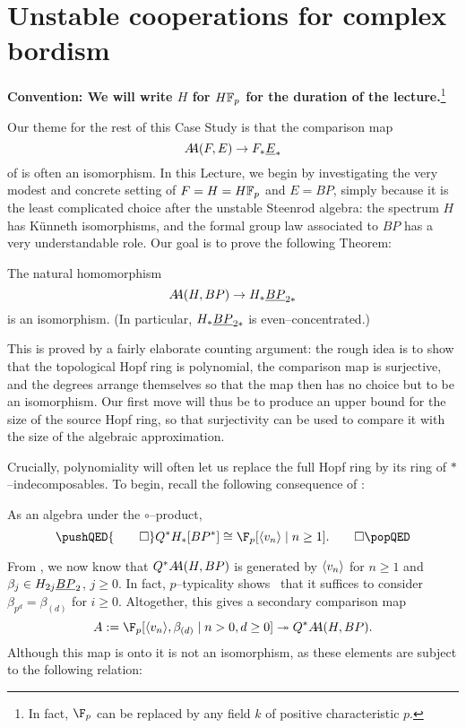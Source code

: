 \section{Unstable cooperations for complex bordism}\label{COableCoopnsII}

\begin{center}
\textbf{Convention: We will write \(H\) for \(\HFp\) for the duration of the lecture.}\footnote{In fact, \(\F_p\) can be replaced by any field \(k\) of positive characteristic \(p\).}
\end{center}

Our theme for the rest of this Case Study is that the comparison map \[\AA(F, E) \to F_* \OS{E}{*}\] of  is often an isomorphism.  In this Lecture, we begin by investigating the very modest and concrete setting of \(F = H = \HFp\) and \(E = BP\), simply because it is the least complicated choice after the unstable Steenrod algebra: the spectrum \(H\) has K\"unneth isomorphisms, and the formal group law associated to \(BP\) has a very understandable role.  Our goal is to prove the following Theorem:

\begin{theorem}\label{HFpBPCooperationsTheorem}
The natural homomorphism \[\AA(H, BP) \to H_* \OS{BP}{2*}\] is an isomorphism.  (In particular, \(H_* \OS{BP}{2*}\) is even--concentrated.)
\end{theorem}

\noindent This is proved by a fairly elaborate counting argument: the rough idea is to show that the topological Hopf ring is polynomial, the comparison map is surjective, and the degrees arrange themselves so that the map then has no choice but to be an isomorphism.  Our first move will thus be to produce an upper bound for the size of the source Hopf ring, so that surjectivity can be used to compare it with the size of the algebraic approximation.

Crucially, polynomiality will often let us replace the full Hopf ring by its ring of \(\ast\)--indecomposables.  To begin, recall the following consequence of :

\begin{corollary}
As an algebra under the \(\circ\)--product,
\[\pushQED{\qed}
Q^* H_*[BP^*] \cong \F_p[\<v_n\> \mid n \ge 1]. \qedhere
\popQED\]
\end{corollary}

\noindent From , we now know that \(Q^* \AA(H, BP)\) is generated by \(\<v_n\>\) for \(n \ge 1\) and \(\beta_j \in H_{2j} \OS{BP}{2}\), \(j \ge 0\).  In fact, \(p\)--typicality shows~\cite[Lemma 4.14]{RavenelWilsonHopfRingForMU} that it suffices to consider \(\beta_{p^d} = \beta_{(d)}\) for \(i \ge 0\).  Altogether, this gives a secondary comparison map \[A := \F_p[\<v_n\>, \beta_{(d)} \mid n > 0, d \ge 0] \onto Q^* \AA(H, BP).\]  Although this map is onto it is not an isomorphism, as these elements are subject to the following relation:


